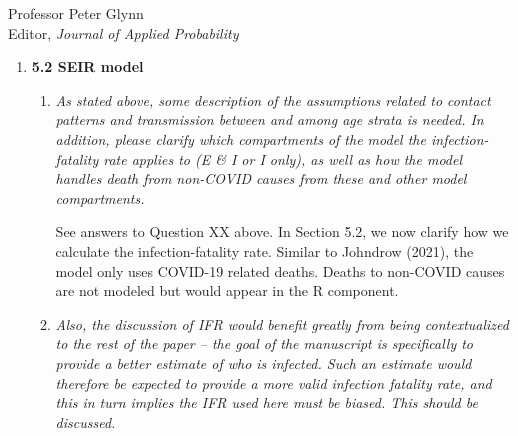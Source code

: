\documentclass[11pt]{letter} %
\begin{document}
\begin{letter}{Professor
	Peter Glynn\\
	Editor, {\em Journal of Applied Probability}}
\begin{enumerate}
\begin{enumerate}
	We thank the reviewer for raising this issue.  We have added a remark in sction 5.1.2 that raises this as a limitation.  We restart here that the need for the approaches is due to the lack of availability of symptom status (which we know the state collects but has told us is unavailable due to data privacy / confidentiality issues).  Therefore, as a framework for health policy experts and government officials who have access to the complete government datasets (i.e., not just the public data), these steps will not be necessary.
	\vspace{5mm}
	\item {\it Also, focusing on the non-Hispanic, white male groups seems potentially to limit understanding of the scope of error. Although Indiana has a very high percent of white individuals, the individuals who present for testing (as well as those who test positive, are exposed in the workplace and home, and hospitalized or die) are disproportionately non-white. It is important to show the performance of the method in both white and non-white individuals because non-white individuals are the ones who are experiencing higher rates of illness and death and therefore will likely be more negatively impacted by biased estimates of disease prevalence.}
	\vspace{5mm}

	We acknowledge this shortcoming.  We now include versions of Figure 6 for non-white groups in Section XX of the supplementary materials.
	\textcolor{red}{NEED TO DO}
	\vspace{5mm}
\end{enumerate}
\item {\bf 5.2 SEIR model}
\begin{enumerate}
	\item {\it As stated above, some description of the assumptions related to contact patterns and transmission between and among age strata is needed. In addition, please clarify which compartments of the model the infection-fatality rate applies to (E \& I or I only), as well as how the model handles death from non-COVID causes from these and other model compartments.}
	\vspace{5mm}

	See answers to Question XX above.  In Section 5.2, we now clarify how we calculate the infection-fatality rate. Similar to Johndrow (2021), the model only uses COVID-19 related deaths.  Deaths to non-COVID causes are not modeled but would appear in the R component.
	\vspace{5mm}
	\item {\it Also, the discussion of IFR would benefit greatly from being contextualized to the rest of the paper – the goal of the manuscript is specifically to provide a better estimate of who is infected. Such an estimate would therefore be expected to provide a more valid infection fatality rate, and this in turn implies the IFR used here must be biased. This should be discussed.}
	\vspace{5mm}


\end{enumerate}
\end{enumerate}
\end{letter}
\end{document}

